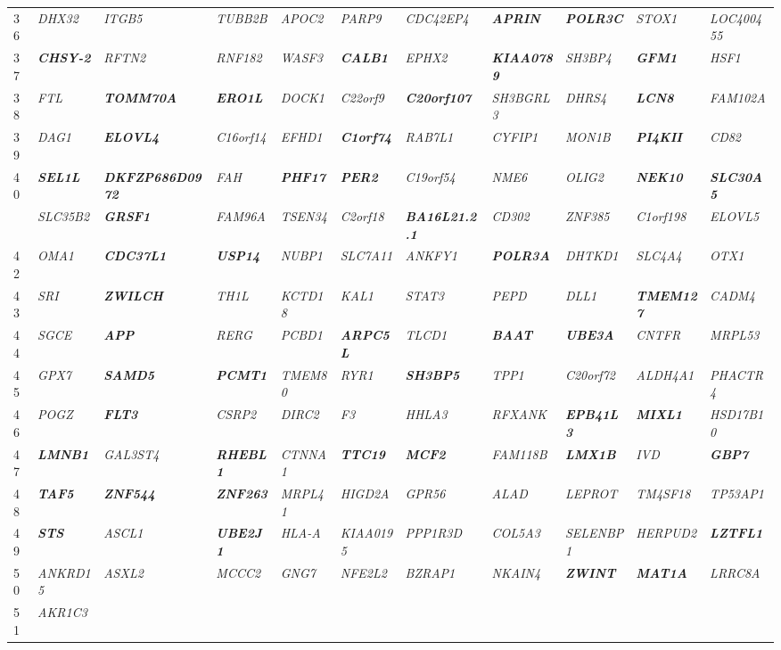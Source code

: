 \documentclass[letterpaper,12pt]{article}
\numberwithin{equation}{appendix}
\begin{document}
\begin{landscape}
{{\begin{longtable}{l >{\itshape}l >{\itshape}l >{\itshape}l >{\itshape}l >{\itshape}l >{\itshape}l >{\itshape}l >{\itshape}l >{\itshape}l >{\itshape}l}
36&DHX32&ITGB5&TUBB2B&APOC2&PARP9&CDC42EP4&{\bfseries {APRIN}}&{\bfseries {POLR3C}}&STOX1&LOC400455\tabularnewline
37&{\bfseries {CHSY-2}}&RFTN2&RNF182&WASF3&{\bfseries {CALB1}}&EPHX2&{\bfseries {KIAA0789}}&SH3BP4&{\bfseries {GFM1}}&HSF1\tabularnewline
38&FTL&{\bfseries {TOMM70A}}&{\bfseries {ERO1L}}&DOCK1&C22orf9&{\bfseries {C20orf107}}&SH3BGRL3&DHRS4&{\bfseries {LCN8}}&FAM102A\tabularnewline
39&DAG1&{\bfseries {ELOVL4}}&C16orf14&EFHD1&{\bfseries {C1orf74}}&RAB7L1&CYFIP1&MON1B&{\bfseries {PI4KII}}&CD82\tabularnewline
40&{\bfseries {SEL1L}}&{\bfseries {DKFZP686D0972}}&FAH&{\bfseries {PHF17}}&{\bfseries {PER2}}&C19orf54&NME6&OLIG2&{\bfseries {NEK10}}&{\bfseries {SLC30A5}}\tabularnewline
\newpage
41&SLC35B2&{\bfseries {GRSF1}}&FAM96A&TSEN34&C2orf18&{\bfseries {BA16L21.2.1}}&CD302&ZNF385&C1orf198&ELOVL5\tabularnewline
42&OMA1&{\bfseries {CDC37L1}}&{\bfseries {USP14}}&NUBP1&SLC7A11&ANKFY1&{\bfseries {POLR3A}}&DHTKD1&SLC4A4&OTX1\tabularnewline
43&SRI&{\bfseries {ZWILCH}}&TH1L&KCTD18&KAL1&STAT3&PEPD&DLL1&{\bfseries {TMEM127}}&CADM4\tabularnewline
44&SGCE&{\bfseries {APP}}&RERG&PCBD1&{\bfseries {ARPC5L}}&TLCD1&{\bfseries {BAAT}}&{\bfseries {UBE3A}}&CNTFR&MRPL53\tabularnewline
45&GPX7&{\bfseries {SAMD5}}&{\bfseries {PCMT1}}&TMEM80&RYR1&{\bfseries {SH3BP5}}&TPP1&C20orf72&ALDH4A1&PHACTR4\tabularnewline
46&POGZ&{\bfseries {FLT3}}&CSRP2&DIRC2&F3&HHLA3&RFXANK&{\bfseries {EPB41L3}}&{\bfseries {MIXL1}}&HSD17B10\tabularnewline
47&{\bfseries {LMNB1}}&GAL3ST4&{\bfseries {RHEBL1}}&CTNNA1&{\bfseries {TTC19}}&{\bfseries {MCF2}}&FAM118B&{\bfseries {LMX1B}}&IVD&{\bfseries {GBP7}}\tabularnewline
48&{\bfseries {TAF5}}&{\bfseries {ZNF544}}&{\bfseries {ZNF263}}&MRPL41&HIGD2A&GPR56&ALAD&LEPROT&TM4SF18&TP53AP1\tabularnewline
49&{\bfseries {STS}}&ASCL1&{\bfseries {UBE2J1}}&HLA-A&KIAA0195&PPP1R3D&COL5A3&SELENBP1&HERPUD2&{\bfseries {LZTFL1}}\tabularnewline
50&ANKRD15&ASXL2&MCCC2&GNG7&NFE2L2&BZRAP1&NKAIN4&{\bfseries {ZWINT}}&{\bfseries {MAT1A}}&LRRC8A\tabularnewline
51&AKR1C3&&&&&&&&&\tabularnewline
\bottomrule
\end{longtable}

}}

{\scriptsize {

}}
\end{landscape}
\end{document}
